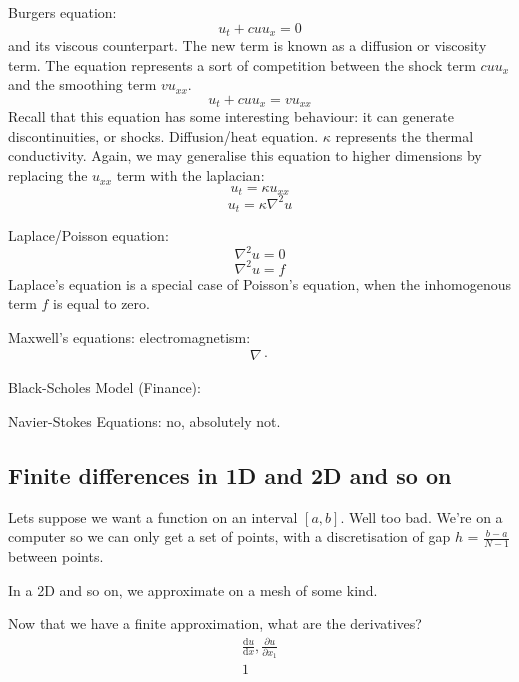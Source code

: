 \documentclass{article}
\numberwithin{equation}{section}
\theoremstyle{definition}
\newcommand{\dd}[2]{\frac{\mathrm{d} #1}{\mathrm{d} #2}}
\newcommand{\pp}[2]{\frac{\partial #1}{\partial #2}}
\begin{document}
Burgers equation:
\begin{equation}
    u_t + cuu_x = 0
\end{equation}
and its viscous counterpart. The new term is known as a diffusion or viscosity term. The equation represents a sort of competition between the shock term $cuu_x$ and the smoothing term $vu_{xx}$.
\begin{equation}
    u_t + cuu_x = vu_{xx}
\end{equation}
Recall that this equation has some interesting behaviour: it can generate discontinuities, or shocks.
Diffusion/heat equation. $\kappa$ represents the thermal conductivity. Again, we may generalise this equation to higher dimensions by replacing the $u_{xx}$ term with the laplacian:
\begin{equation}
    u_t = \kappa u_{xx}
\end{equation}
\begin{equation}
    u_t = \kappa \nabla^2u
\end{equation}

Laplace/Poisson equation:
\begin{equation}
    \nabla^2u = 0
\end{equation}
\begin{equation}
    \nabla^2u = f
\end{equation}
Laplace's equation is a special case of Poisson's equation, when the inhomogenous term $f$ is equal to zero.

Maxwell's equations: electromagnetism:
\begin{align}
    \nabla \cdot 
\end{align}

Black-Scholes Model (Finance):


Navier-Stokes Equations:
no, absolutely not.


\subsection{Finite differences in 1D and 2D and so on}

Lets suppose we want a function on an interval $[a,b]$. Well too bad. We're on a computer so we can only get a set of points, with a discretisation of gap $h$ = $\frac{b-a}{N-1}$ between points.

In a 2D and so on, we approximate on a mesh of some kind.

Now that we have a finite approximation, what are the derivatives?
\begin{align}
    \dd{u}{x}, \pp{u}{x_1} \\
    1
\end{align}
\end{document}
